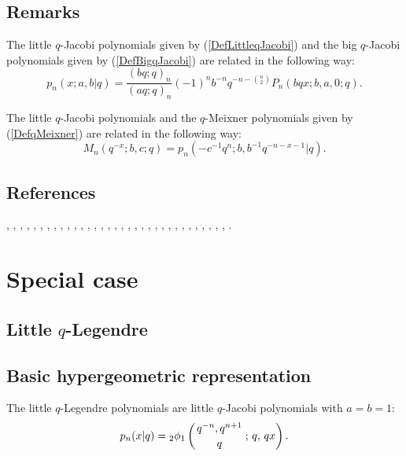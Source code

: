 \documentclass[envcountchap,graybox]{svmono}
\newcommand{\qhyp}[5]{\mbox{}_{#1}{\phi}_{#2}
\left(\genfrac{}{}{0pt}{}{#3}{#4}\,;\,q,\,#5\right)}
\begin{document}
\subsection*{Remarks} 
The little $q$-Jacobi polynomials given by
(\ref{DefLittleqJacobi}) and the big $q$-Jacobi polynomials given by
(\ref{DefBigqJacobi}) are related in the following way:
$$p_n(x;a,b|q)=\frac{(bq;q)_n}{(aq;q)_n}(-1)^nb^{-n}q^{-n-\binom{n}{2}}
P_n(bqx;b,a,0;q).$$

\noindent
The little $q$-Jacobi polynomials and the $q$-Meixner polynomials given by (\ref{DefqMeixner})
are related in the following way:
$$M_n(q^{-x};b,c;q)=p_n(-c^{-1}q^n;b,b^{-1}q^{-n-x-1}|q).$$

\subsection*{References}
\cite{NAlSalam89}, \cite{AlSalam90}, \cite{AlSalamIsmail77}, \cite{AlSalamIsmail83},
\cite{AndrewsAskey77}, \cite{AndrewsAskey85}, \cite{Askey89I}, \cite{AtakKlimyk2004},
\cite{AtakRahmanSuslov}, \cite{DattaGriffin}, \cite{Floris96}, \cite{Floris97},
\cite{FlorisKoelink}, \cite{GasperRahman84}, \cite{GasperRahman90}, \cite{GrunbaumHaine96},
\cite{Hahn}, \cite{Ismail86I}, \cite{IsmailMassonRahman}, \cite{IsmailWilson}, \cite{Kadell},
\cite{Koelink96I}, \cite{KoelinkKoorn}, \cite{Koorn89III}, \cite{Koorn90II},
\cite{Koorn91}, \cite{Koorn93}, \cite{Masuda+91}, \cite{Miller89}, \cite{Nikiforov+},
\cite{Rahman82}, \cite{Srivastava82}, \cite{SrivastavaJain90}, \cite{Stanton80I}.


\section*{Special case}

\subsection{Little $q$-Legendre}
\par

\subsection*{Basic hypergeometric representation} The little $q$-Legendre polynomials are little $q$-Jacobi
polynomials with $a=b=1$:
\begin{equation}
\label{DefLittleqLegendre}
p_n(x|q)=\qhyp{2}{1}{q^{-n},q^{n+1}}{q}{qx}.
\end{equation}
\end{document}
